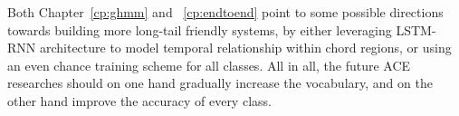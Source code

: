 Both Chapter~\ref{cp:ghmm} and ~\ref{cp:endtoend} point to some possible directions towards building more long-tail friendly systems, by either leveraging LSTM-RNN architecture to model temporal relationship within chord regions, or using an even chance training scheme for all classes. All in all, the future ACE researches should on one hand gradually increase the vocabulary, and on the other hand improve the accuracy of every class.




 







